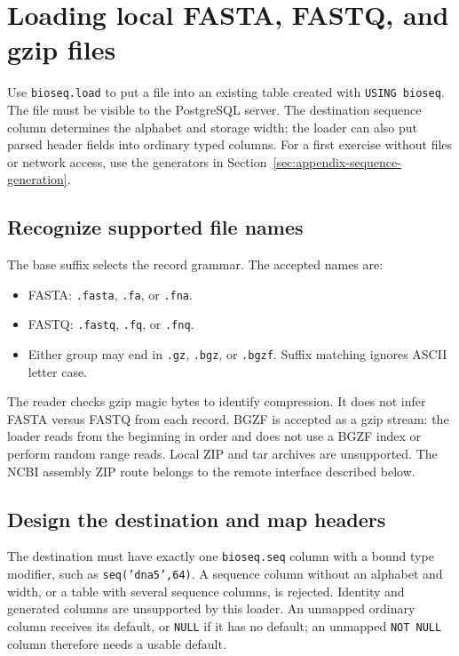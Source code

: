 \section{Loading local FASTA, FASTQ, and gzip files}
\label{sec:appendix-local-ingestion}
\label{sec:app-local-ingestion}

Use \texttt{bioseq.load} to put a file into an existing table created with
\texttt{USING bioseq}. The file must be visible to the PostgreSQL server.
The destination sequence column determines the alphabet and storage width;
the loader can also put parsed header fields into ordinary typed columns.
For a first exercise without files or network access, use the generators in
Section~\ref{sec:appendix-sequence-generation}.

\subsection{Recognize supported file names}

The base suffix selects the record grammar. The accepted names are:
\begin{itemize}
  \item FASTA: \texttt{.fasta}, \texttt{.fa}, or \texttt{.fna}.
  \item FASTQ: \texttt{.fastq}, \texttt{.fq}, or \texttt{.fnq}.
  \item Either group may end in \texttt{.gz}, \texttt{.bgz}, or
        \texttt{.bgzf}. Suffix matching ignores ASCII letter case.
\end{itemize}
The reader checks gzip magic bytes to identify compression. It does not infer
FASTA versus FASTQ from each record. BGZF is accepted as a gzip stream: the
loader reads from the beginning in order and does not use a BGZF index or
perform random range reads. Local ZIP and tar archives are unsupported.
The NCBI assembly ZIP route belongs to the remote interface described below.

\subsection{Design the destination and map headers}

The destination must have exactly one \texttt{bioseq.seq} column with a bound
type modifier, such as \texttt{seq('dna5',64)}. A sequence column without an
alphabet and width, or a table with several sequence columns, is rejected.
Identity and generated columns are unsupported by this loader. An unmapped
ordinary column receives its default, or \texttt{NULL} if it has no default;
an unmapped \texttt{NOT NULL} column therefore needs a usable default.

